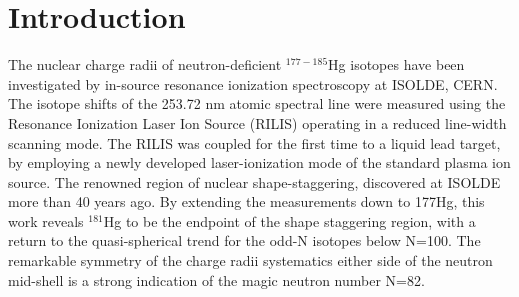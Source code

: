 \section{Introduction}
The nuclear charge radii of neutron-deficient $^{177-185}$Hg isotopes have been investigated by in-source resonance ionization spectroscopy at ISOLDE, CERN.  The isotope shifts of the 253.72 nm atomic spectral line were measured using the Resonance Ionization Laser Ion Source (RILIS) operating in a reduced line-width scanning mode.  The RILIS was coupled for the first time to a liquid lead target, by employing a newly developed laser-ionization mode of the standard plasma ion source. The renowned region of nuclear shape-staggering, discovered at ISOLDE more than 40 years ago.  By extending the measurements down to 177Hg, this work reveals $^{181}$Hg to be the endpoint of the shape staggering region, with a return to the quasi-spherical trend for the odd-N isotopes below N=100.  The remarkable symmetry of the charge radii systematics either side of the neutron mid-shell is a strong indication of the magic neutron number N=82.